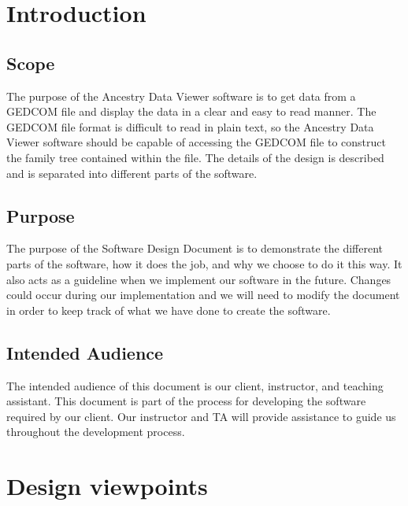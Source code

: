 \documentclass[onecolumn, draftclsnofoot, 10pt, compsoc]{IEEEtran}
\begin{document}
\section{Introduction}
\subsection{Scope}
\begin{singlespace}
The purpose of the Ancestry Data Viewer software is to get data from a GEDCOM file and display the data in a clear and easy to read manner. The GEDCOM file format is difficult to read in plain text, so the Ancestry Data Viewer software should be capable of accessing the GEDCOM file to construct the family tree contained within the file. The details of the design is described and is separated into different parts of the software.
\end{singlespace}

\subsection{Purpose}
\begin{singlespace}
The purpose of the Software Design Document is to demonstrate the different parts of the software, how it does the job, and why we choose to do it this way. It also acts as a guideline when we implement our software in the future. Changes could occur during our implementation and we will need to modify the document in order to keep track of what we have done to create the software. 
\end{singlespace}

\subsection{Intended Audience}
\begin{singlespace}
The intended audience of this document is our client, instructor, and teaching assistant. This document is part of the process for developing the software required by our client. Our instructor and TA will provide assistance to guide us throughout the development process.   
\end{singlespace}

\section{Design viewpoints}
\end{document}
